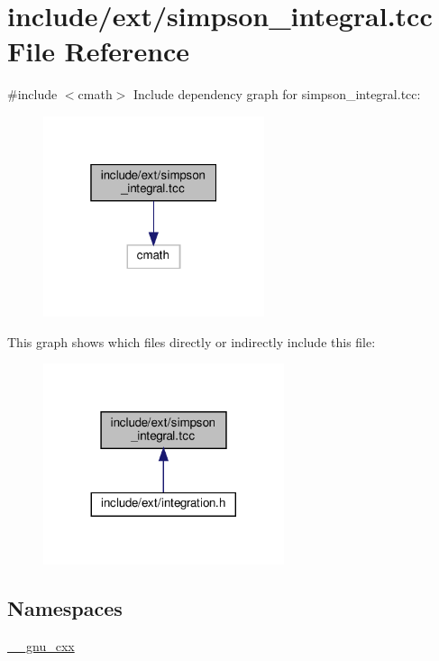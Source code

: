 \hypertarget{simpson__integral_8tcc}{}\section{include/ext/simpson\+\_\+integral.tcc File Reference}
\label{simpson__integral_8tcc}
{\ttfamily \#include $<$cmath$>$}\newline
Include dependency graph for simpson\+\_\+integral.\+tcc\+:
\nopagebreak
\begin{figure}[H]
\begin{center}
\leavevmode
\includegraphics[width=184pt]{simpson__integral_8tcc__incl}
\end{center}
\end{figure}
This graph shows which files directly or indirectly include this file\+:
\nopagebreak
\begin{figure}[H]
\begin{center}
\leavevmode
\includegraphics[width=200pt]{simpson__integral_8tcc__dep__incl}
\end{center}
\end{figure}
\subsection*{Namespaces}
\begin{DoxyCompactItemize}
\item 
 \hyperlink{namespace____gnu__cxx}{\+\_\+\+\_\+gnu\+\_\+cxx}
\end{DoxyCompactItemize}
